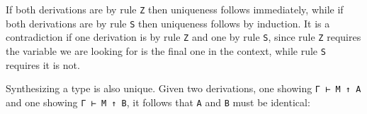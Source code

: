 If both derivations are by rule \texttt{Z} then uniqueness follows
immediately, while if both derivations are by rule \texttt{S} then
uniqueness follows by induction. It is a contradiction if one derivation
is by rule \texttt{Z} and one by rule \texttt{S}, since rule \texttt{Z}
requires the variable we are looking for is the final one in the
context, while rule \texttt{S} requires it is not.

Synthesizing a type is also unique. Given two derivations, one showing
\texttt{Γ\ ⊢\ M\ ↑\ A} and one showing \texttt{Γ\ ⊢\ M\ ↑\ B}, it
follows that \texttt{A} and \texttt{B} must be identical:

\begin{fence}
\begin{code}%
\>[0]\AgdaSpace{}%
\AgdaSymbol{:}\AgdaSpace{}%
\AgdaSpace{}%
\AgdaSymbol{\{}\AgdaSpace{}%
\AgdaSpace{}%
\AgdaSpace{}%
\AgdaSymbol{\}}\AgdaSpace{}%
\AgdaSpace{}%
\AgdaSpace{}%
\AgdaSpace{}%
\AgdaSpace{}%
\AgdaSpace{}%
\AgdaSpace{}%
\AgdaSpace{}%
\AgdaSpace{}%
\AgdaSpace{}%
\AgdaSpace{}%
\AgdaSpace{}%
\AgdaSpace{}%
\AgdaSpace{}%
\AgdaSpace{}%
\AgdaSpace{}%
\<%
\\
\>[0]\AgdaSpace{}%
\AgdaSymbol{(}\AgdaSpace{}%
\AgdaSymbol{)}\AgdaSpace{}%
\AgdaSymbol{(}\AgdaSpace{}%
\AgdaSymbol{)}%
\>[30]\AgdaSymbol{=}%
\>[33]\AgdaSpace{}%
\AgdaSpace{}%
\<%
\\
\>[0]\AgdaSpace{}%
\AgdaSymbol{(}\AgdaSpace{}%
\AgdaSpace{}%
\AgdaSymbol{)}\AgdaSpace{}%
\AgdaSymbol{(}\AgdaSpace{}%
\AgdaSpace{}%
\AgdaSymbol{)}%
\>[30]\AgdaSymbol{=}%
\>[33]\AgdaSpace{}%
\AgdaSymbol{(}\AgdaSpace{}%
\AgdaSpace{}%
\AgdaSymbol{)}\<%
\\
\>[0]\AgdaSpace{}%
\AgdaSymbol{(}\AgdaSpace{}%
\AgdaSymbol{)}\AgdaSpace{}%
\AgdaSymbol{(}\AgdaSpace{}%
\AgdaSymbol{)}%
\>[30]\AgdaSymbol{=}%
\>[33]\<%
\end{code}
\end{fence}

